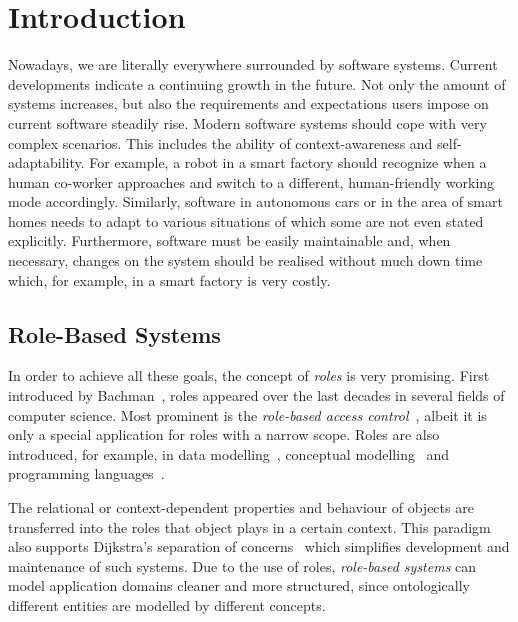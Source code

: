 
\chapter{Introduction}
\label{ch:introduction}

Nowadays, we are literally everywhere surrounded by software systems. Current developments indicate
a continuing growth in the future.  Not only the amount of systems increases, but also the
requirements and expectations users impose on current software steadily rise. Modern software
systems should cope with very complex scenarios. This includes the ability of context-awareness and
self-adaptability. For example, a robot in a smart factory should recognize when a human co-worker
approaches and switch to a different, human-friendly working mode accordingly. Similarly, software
in autonomous cars or in the area of smart homes needs to adapt to various situations of which some
are not even stated explicitly.
%
Furthermore, software must be easily maintainable and, when necessary, changes on the system should
be realised without much down time which, for example, in a smart factory is very costly.

\section{Role-Based Systems}
\label{sec:intro-role-based-systems}

In order to achieve all these goals, the concept of \emph{roles} is very promising. First introduced
by Bachman~\cite{BaD-VLDB77}, roles appeared over the last decades in several fields of computer
science. Most prominent is the \emph{role-based access
  control}~\cite{FeKC-RBAC03,AlFe-ECS11,SaCF-IEEE96}, albeit it is only a special application for
roles with a narrow scope. Roles are also introduced, for example, in data
modelling~\cite{Ha-ORM2006}, conceptual modelling~\cite{Stei-DKE00,Gui-PHD05,Stei-AO07} and
programming languages~\cite{BaBT-SAC06,Herr-AO07,BaGE-ECOOP07}.

The relational or context-dependent properties and behaviour of objects are transferred into the
roles that object plays in a certain context. This paradigm also supports Dijkstra's separation of
concerns~\cite{Dij-SelWrCom82} which simplifies development and maintenance of such systems.  Due to
the use of roles, \emph{role-based systems} can model application domains cleaner and more
structured, since ontologically different entities are modelled by different concepts.

